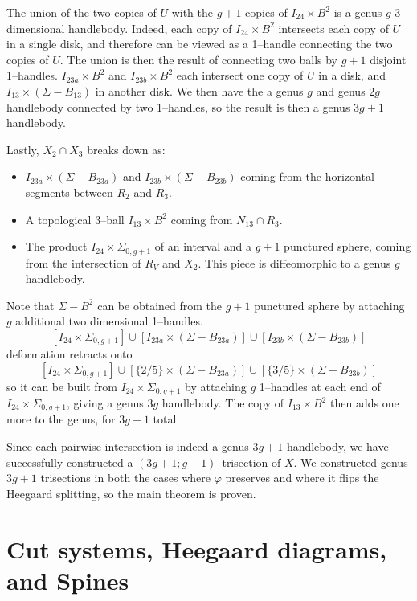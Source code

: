 \documentclass[12pt]{amsart}
\theoremstyle{definition}
\theoremstyle{remark}
\begin{document}
The union of the two copies of $U$ with the $g+1$ copies of $I_{24} \times B^2$ is a genus $g$ 3--dimensional handlebody.  Indeed, each copy of $I_{24} \times B^2$ intersects each copy of $U$ in a single disk, and therefore can be viewed as a 1--handle connecting the two copies of $U$.  The union is then the result of connecting two balls by $g+1$ disjoint 1--handles.  $I_{23a} \times B^2$ and $I_{23b} \times B^2$ each intersect one copy of $U$ in a disk, and $I_{13} \times (\Sigma - B_{13})$ in another disk.   We then have the a genus $g$ and genus $2g$ handlebody connected by two 1--handles, so the result is then a genus $3g+1$ handlebody.

Lastly, $X_2 \cap X_3$ breaks down as:
\begin{itemize}
\item $I_{23a} \times (\Sigma - B_{23a})$ and $I_{23b} \times (\Sigma - B_{23b})$ coming from the horizontal segments between $R_2$ and $R_3$.
\item A topological 3--ball $I_{13} \times B^2$ coming from $N_{13} \cap R_3$.
\item The product $I_{24} \times \Sigma_{0,g+1}$ of an interval and a $g+1$ punctured sphere, coming from the intersection of $R_V$ and $X_2$.  This piece is diffeomorphic to a genus $g$ handlebody.
\end{itemize}

Note that $\Sigma - B^2$ can be obtained from the $g+1$ punctured sphere by attaching $g$ additional two dimensional 1--handles.  $$\left[ I_{24} \times \Sigma_{0,g+1} \right] \cup \left[ I_{23a} \times (\Sigma - B_{23a}) \right] \cup \left[ I_{23b} \times (\Sigma - B_{23b}) \right]$$ deformation retracts onto $$\left[ I_{24} \times \Sigma_{0,g+1} \right] \cup \left[ \{2/5\} \times (\Sigma - B_{23a}) \right] \cup \left[ \{3/5\} \times (\Sigma - B_{23b}) \right]$$ so it can be built from $I_{24} \times \Sigma_{0,g+1}$ by attaching $g$ 1--handles at each end of $I_{24} \times \Sigma_{0,g+1}$, giving a genus $3g$ handlebody.  The copy of $I_{13} \times B^2$ then adds one more to the genus, for $3g+1$ total.


Since each pairwise intersection is indeed a genus $3g+1$ handlebody, we have successfully constructed a $(3g+1;g+1)$--trisection of $X$.  We constructed genus $3g+1$ trisections in both the cases where $\varphi$ preserves and where it flips the Heegaard splitting, so the main theorem is proven.

\section{Cut systems, Heegaard diagrams, and Spines}
\label{sec_cutsystems}
\end{document}
